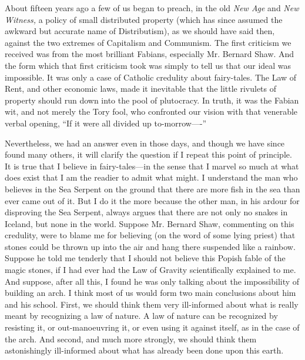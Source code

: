 \documentclass{book}
\begin{document}
About fifteen years ago a few of us began to preach, in the old \emph{New Age} and \emph{New Witness,} a policy of small distributed property (which has since assumed the awkward but accurate name of Distributism), as we should have said then, against the two extremes of Capitalism and Communism. The first criticism we received was from the most brilliant Fabians, especially Mr. Bernard Shaw. And the form which that first criticism took was simply to tell us that our ideal was impossible. It was only a case of Catholic credulity about fairy-tales. The Law of Rent, and other economic laws, made it inevitable that the little rivulets of property should run down into the pool of plutocracy. In truth, it was the Fabian wit, and not merely the Tory fool, who confronted our vision with that venerable verbal opening, “If it were all divided up to-morrow—-”

Nevertheless, we had an answer even in those days, and though we have since found many others, it will clarify the question if I repeat this point of principle. It is true that I believe in fairy-tales—in the sense that I marvel so much at what does exist that I am the readier to admit what might. I understand the man who believes in the Sea Serpent on the ground that there are more fish in the sea than ever came out of it. But I do it the more because the other man, in his ardour for disproving the Sea Serpent, always argues that there are not only no snakes in Iceland, but none in the world. Suppose Mr. Bernard Shaw, commenting on this credulity, were to blame me for believing (on the word of some lying priest) that stones could be thrown up into the air and hang there suspended like a rainbow. Suppose he told me tenderly that I should not believe this Popish fable of the magic stones, if I had ever had the Law of Gravity scientifically explained to me. And suppose, after all this, I found he was only talking about the impossibility of building an arch. I think most of us would form two main conclusions about him and his school. First, we should think them very ill-informed about what is really meant by recognizing a law of nature. A law of nature can be recognized by resisting it, or out-manoeuvring it, or even using it against itself, as in the case of the arch. And second, and much more strongly, we should think them astonishingly ill-informed about what has already been done upon this earth.
\end{document}

